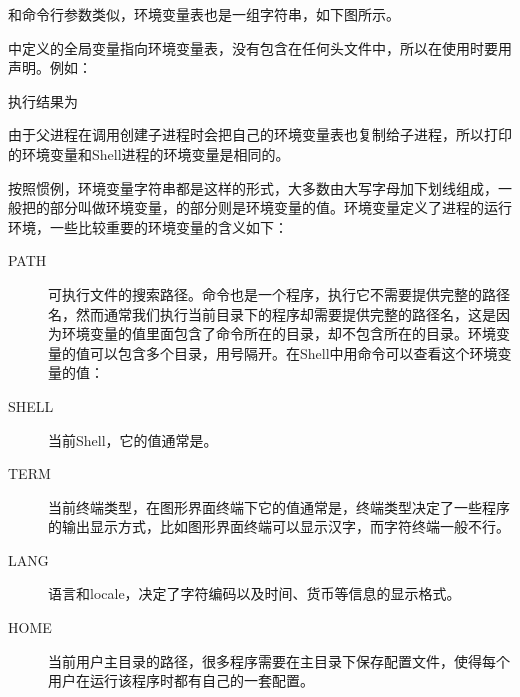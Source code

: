 

和命令行参数类似，环境变量表也是一组字符串，如下图所示。




中定义的全局变量指向环境变量表，没有包含在任何头文件中，所以在使用时要用声明。例如：





执行结果为




由于父进程在调用创建子进程时会把自己的环境变量表也复制给子进程，所以打印的环境变量和Shell进程的环境变量是相同的。



按照惯例，环境变量字符串都是这样的形式，大多数由大写字母加下划线组成，一般把的部分叫做环境变量，的部分则是环境变量的值。环境变量定义了进程的运行环境，一些比较重要的环境变量的含义如下：


\begin{description}
\item[{PATH}]


可执行文件的搜索路径。命令也是一个程序，执行它不需要提供完整的路径名，然而通常我们执行当前目录下的程序却需要提供完整的路径名，这是因为环境变量的值里面包含了命令所在的目录，却不包含所在的目录。环境变量的值可以包含多个目录，用\BookCode{:\BookSplit{}}号隔开。在Shell中用命令可以查看这个环境变量的值：


\item[{SHELL}]


当前Shell，它的值通常是。

\item[{TERM}]


当前终端类型，在图形界面终端下它的值通常是，终端类型决定了一些程序的输出显示方式，比如图形界面终端可以显示汉字，而字符终端一般不行。

\item[{LANG}]


语言和locale，决定了字符编码以及时间、货币等信息的显示格式。

\item[{HOME}]


当前用户主目录的路径，很多程序需要在主目录下保存配置文件，使得每个用户在运行该程序时都有自己的一套配置。


\end{description}


